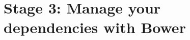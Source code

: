 \section{Stage 3: Manage your dependencies with Bower}

\begin{frame}[fragile]
\end{frame}

\begin{frame}[fragile]
\end{frame}

